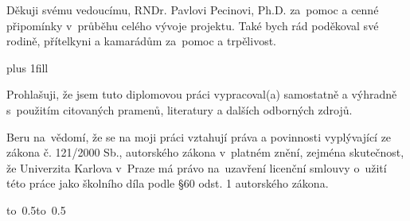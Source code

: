 \documentclass[12pt,a4paper]{report}
\let\openright=\clearpage
\begin{document}
\newpage



\openright

\noindent
Děkuji svému vedoucímu, RNDr. Pavlovi Pecinovi, Ph.D. za~pomoc a cenné připomínky v~průběhu celého vývoje projektu. Také bych rád poděkoval své rodině, přítelkyni a kamarádům za~pomoc a trpělivost.

\newpage


\vglue 0pt plus 1fill

\noindent
Prohlašuji, že jsem tuto diplomovou práci vypracoval(a) samostatně a výhradně
s~použitím citovaných pramenů, literatury a dalších odborných zdrojů.

\medskip\noindent
Beru na~vědomí, že se na moji práci vztahují práva a povinnosti vyplývající
ze zákona č. 121/2000 Sb., autorského zákona v~platném znění, zejména skutečnost,
že Univerzita Karlova v~Praze má právo na~uzavření licenční smlouvy o~užití této
práce jako školního díla podle §60 odst. 1 autorského zákona.

\vspace{10mm}

\hbox{\hbox to 0.5\hbox to 0.5}

\vspace{20mm}
\newpage

\end{document}
